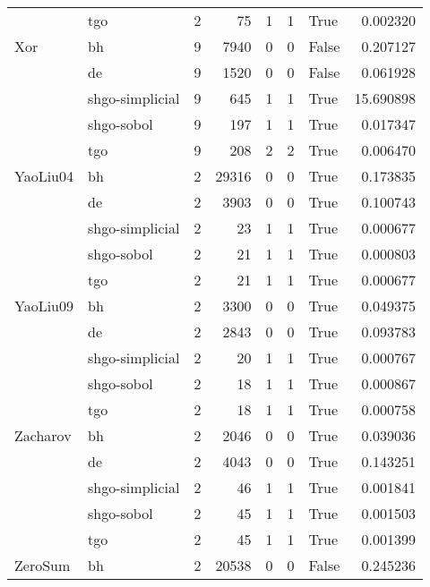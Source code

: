 \begin{longtable}{llrrrrlr}
         & tgo &     2 &       75 &      1 &       1 &    True &    0.002320 \\
Xor & bh &     9 &     7940 &      0 &       0 &   False &    0.207127 \\
         & de &     9 &     1520 &      0 &       0 &   False &    0.061928 \\
         & shgo-simplicial &     9 &      645 &      1 &       1 &    True &   15.690898 \\
         & shgo-sobol &     9 &      197 &      1 &       1 &    True &    0.017347 \\
         & tgo &     9 &      208 &      2 &       2 &    True &    0.006470 \\
YaoLiu04 & bh &     2 &    29316 &      0 &       0 &    True &    0.173835 \\
         & de &     2 &     3903 &      0 &       0 &    True &    0.100743 \\
         & shgo-simplicial &     2 &       23 &      1 &       1 &    True &    0.000677 \\
         & shgo-sobol &     2 &       21 &      1 &       1 &    True &    0.000803 \\
         & tgo &     2 &       21 &      1 &       1 &    True &    0.000677 \\
YaoLiu09 & bh &     2 &     3300 &      0 &       0 &    True &    0.049375 \\
         & de &     2 &     2843 &      0 &       0 &    True &    0.093783 \\
         & shgo-simplicial &     2 &       20 &      1 &       1 &    True &    0.000767 \\
         & shgo-sobol &     2 &       18 &      1 &       1 &    True &    0.000867 \\
         & tgo &     2 &       18 &      1 &       1 &    True &    0.000758 \\
Zacharov & bh &     2 &     2046 &      0 &       0 &    True &    0.039036 \\
         & de &     2 &     4043 &      0 &       0 &    True &    0.143251 \\
         & shgo-simplicial &     2 &       46 &      1 &       1 &    True &    0.001841 \\
         & shgo-sobol &     2 &       45 &      1 &       1 &    True &    0.001503 \\
         & tgo &     2 &       45 &      1 &       1 &    True &    0.001399 \\
ZeroSum & bh &     2 &    20538 &      0 &       0 &   False &    0.245236 \\

\end{longtable}
